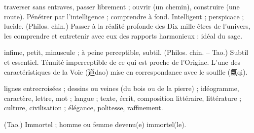 \begin{Def}[tong 通]
    traverser sans entraves, passer librement ; ouvrir (un chemin), construire (une route).     Pénétrer par l’intelligence ; comprendre à fond. Intelligent ; perspicace ; lucide.     (Philos. chin.) Passer à la réalité profonde des Dix mille êtres de l’univers, les comprendre et entretenir avec eux des rapports harmonieux : idéal du sage.
\end{Def}
\begin{Def}[wei 微]
    infime, petit, minuscule ; à peine perceptible, subtil. (Philos. chin. – Tao.) Subtil et essentiel. Ténuité imperceptible de ce qui est proche de l’Origine. L’une des caractéristiques de la Voie (道dao) mise en correspondance avec le souffle (氣qi). 
\end{Def}

\begin{Def}[wen 文]
    lignes entrecroisées ; dessins ou veines (du bois ou de la pierre) ; idéogramme, caractère, lettre, mot ; langue ; texte, écrit, composition littéraire, littérature ; culture, civilisation ; élégance, politesse, raffinement. 
\end{Def}


\begin{Def}[xian仙]
    (Tao.) Immortel ; homme ou femme devenu(e) immortel(le). 
\end{Def}

